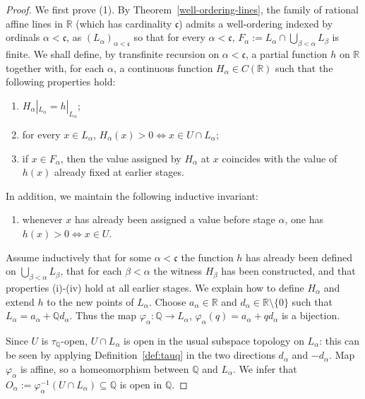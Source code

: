 \documentclass[11pt]{amsart} %
\theoremstyle{definition}
\newcommand{\Q}{\mathbb{Q}}
\begin{document}
\begin{proof}
We first prove (1). By Theorem~\ref{well-ordering-lines}, the family of rational affine lines in $\mathbb{R}$ (which has cardinality $\mathfrak{c}$) admits a  well-ordering indexed by ordinals $\alpha<\mathfrak{c}$,  as $(L_{\alpha})_{\alpha<\mathfrak{c}}$ so that for every $\alpha<\mathfrak{c}$, $F_{\alpha}:=L_{\alpha}\cap\bigcup_{\beta<\alpha}L_{\beta}$ is finite. We shall define, by transfinite recursion on $\alpha<\mathfrak{c}$, a partial function $h$ on $\mathbb{R}$ together with, for each $\alpha$, a continuous function $H_{\alpha}\in C(\mathbb{R})$ such that the following properties hold:
\begin{enumerate}
    \item[(i)] $H_{\alpha}|_{L_{\alpha}}=h|_{L_{\alpha}}$;
    \item[(ii)] for every $x\in L_{\alpha}$, $H_{\alpha}(x)>0\iff x\in U\cap L_{\alpha}$;
    \item[(iii)] if $x\in F_{\alpha}$, then the value assigned by $H_{\alpha}$ at $x$ coincides with the value of $h(x)$ already fixed at earlier stages.
\end{enumerate}
In addition, we maintain the following inductive invariant:
\begin{enumerate}
    \item[(iv)] whenever $x$ has already been assigned a value before stage $\alpha$, one has $h(x)>0\iff x\in U$.
\end{enumerate}

Assume inductively that for some $\alpha<\mathfrak{c}$ the function $h$ has already been defined on $\bigcup_{\beta<\alpha}L_{\beta}$, that for each $\beta<\alpha$ the witness $H_{\beta}$ has been constructed, and that properties (i)-(iv) hold at all earlier stages. We explain how to define $H_{\alpha}$ and extend $h$ to the new points of $L_{\alpha}$. Choose $a_{\alpha}\in\mathbb{R}$ and $d_{\alpha}\in\mathbb{R}\setminus\{0\}$ such that $L_{\alpha}=a_{\alpha}+\mathbb{Q}d_{\alpha}$. Thus the map $\varphi_{\alpha}:\mathbb{Q}\rightarrow L_{\alpha}$, $\varphi_{\alpha}(q)=a_{\alpha}+qd_{\alpha}$ is a bijection.

Since $U$ is $\tau_{\Q}$-open, %
$U\cap L_{\alpha}$ is open in the usual subspace topology on $L_{\alpha}$: this can be seen by applying Definition~\ref{def:tauq} in the two directions $d_{\alpha}$ and $-d_{\alpha}$. Map $\varphi_{\alpha}$ is affine, so a homeomorphism between  $\Q$ and $L_{\alpha}$. We infer that  
$O_{\alpha}:=\varphi_{\alpha}^{-1}(U\cap L_{\alpha})\subseteq\mathbb{Q}$ is open in $\mathbb{Q}$. 


\end{proof}
\end{document}
